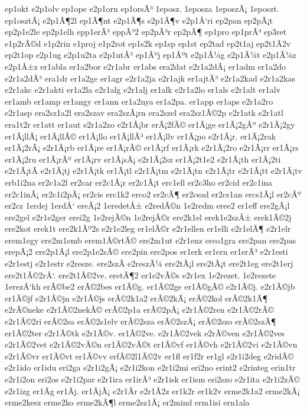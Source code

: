 {ep1okt
e2p1olv
ep1ope
e2p1orn
ep1orsÃ³
1eposz.
1eposza
1eposzÃ¡
1eposzt.
ep1osztÃ¡
e2p1Ã¶2l
ep1Ã¶nt
e2p1Ã¶s
e2p1Ã¶v
e2p1Å‘ri
ep2pan
ep2pÃ¡t
ep2p1e2le
ep2p1elh
epp1erÃ³
eppÃ³2
ep2pÃ³r
ep2pÃ¶
ep1pro
ep1prÃ³
ep3ret
e1p2rÃ©d
e1p2rin
e1proj
e1p2rot
ep1s2k
ep1sp
ep1st
ep2tad
ep2t1aj
ep2t1Ã­2v
ep2t1op
e2p1ug
e2p1u2ta
e2p1utÃ³
ep1Ãºj
ep1Ãºt
e2p1Ã¼g
e2p1Ã¼t
e2p1Ã¼z
e2p1Å±z
er1abla
er1a2bor
e2r1abr
er1abs
era2dat
e2r1a2dÃ¡
er1adm
er1a2do
e2r1a2dÃ³
era1dr
er1a2ge
er1agr
e2r1a2ja
e2r1ajk
er1ajtÃ³
e2r1a2kad
e2r1a2kas
e2r1akc
e2r1akti
er1a2la
e2r1alg
e2r1alj
er1alk
e2r1a2lo
er1als
e2r1alt
er1alv
er1amb
er1amp
er1angy
er1ann
er1a2nya
er1a2pa.
er1app
er1aps
e2r1a2ro
e2r1asp
era2sz1a2l
era2szav
era2szÃ¡rn
era2szel
era2sz1Ã©2p
e2r1atk
e2r1atl
era1t2r
er1att
er1aut
e2r1a2zo
e2r1Ã¡br
erÃ¡2fÃ©
er1Ã¡ge
er1Ã¡2gÃº
e2r1Ã¡2gy
er1Ã¡llÃ¡
er1Ã¡llÃ©
er1Ã¡llo
er1Ã¡llÃ³
er1Ã¡llv
er1Ã¡po
e2r1Ã¡r.
er1Ã¡2rak
er1Ã¡2rÃ¡
e2r1Ã¡rb
er1Ã¡re
er1Ã¡rÃ©
er1Ã¡rf
er1Ã¡rk
e2r1Ã¡2ro
e2r1Ã¡rr
er1Ã¡rs
er1Ã¡2ru
er1Ã¡rÃº
er1Ã¡rv
er1Ã¡sÃ¡
e2r1Ã¡2sz
er1Ã¡2t1e2
e2r1Ã¡th
er1Ã¡2ti
e2r1Ã¡tÃ­
e2r1Ã¡tj
e2r1Ã¡tk
er1Ã¡tl
e2r1Ã¡tm
e2r1Ã¡tn
e2r1Ã¡tr
e2r1Ã¡tt
e2r1Ã¡tv
erb1i2na
er2c1a2l
er2car
er2c1Ã¡r
er2c1Ã¡t
erc1ell
er2c3ho
er2cid
er2c1ina
er2c1inÃ¡
er2c1i2pÃ¡
er2cis
erc1k2
erco2
er2cÃ¶
er2csad
er2cs1an
ercs1Ã¡l
er2cÃº
er2cz
1erdej
1erdÅ‘
ereÃ¡2
1eredetÅ±
e2redÃ©n
1e2redm
eree2
er1eff
ere2gÃ¡l
ere2gel
e2r1e2ger
erei2g
1e2rejÃ©n
1e2rejÃ©r
ere2k1el
erek1e2szÅ±
erek1Ã©2j
ere2kot
erek1t
ere2k1Ãº2s
e2r1e2leg
er1elÃ©r
e2r1ellen
er1elli
e2r1elÃ¶
e2r1elr
erem1egy
ere2m1emb
erem1Ã©rtÃ©
ere2m1ut
e2r1enz
ereo1gra
ere2pan
ere2pas
erepÃ¡2
ere2p1Ã¡l
ere2p1e2sÃ©
ere2pin
ere2pos
er1erk
er1ern
er1erÃ³
e2r1esti
e2r1estj
e2r1estr
e2resze.
ere2szÃ­
e2reszÃ¼
ere2tÃ¡l
ere2tÃ¡t
ere2t1eg
ere2t1erj
ere2t1Ã©2rÅ‘.
ere2t1Ã©2ve.
eretÃ¶2
er1e2vÃ©s
e2r1ex
1e2rezet.
1e2rezete
1erezÅ‘kh
erÃ©be2
erÃ©2bes
er1Ã©g.
er1Ã©2ge
er1Ã©gÃ©
e2r1Ã©j.
e2r1Ã©jb
er1Ã©jf
e2r1Ã©jn
e2r1Ã©js
erÃ©2k1a2
erÃ©2kÃ¡
erÃ©2kol
erÃ©2k1Ã¶
e2rÃ©neke
e2r1Ã©2nekÃ©
erÃ©2p1a
erÃ©2pÃ¡
e2r1Ã©2ren
e2r1Ã©2rÃ©
e2r1Ã©2ri
erÃ©2sa
erÃ©2s1elv
erÃ©2sza
erÃ©2szÃ¡
erÃ©2szo
erÃ©2szÃ¶
er1Ã©2ter
e2r1Ã©tk
e2r1Ã©v.
er1Ã©2ve.
e2r1Ã©2vek
e2rÃ©ven
e2r1Ã©2ves
e2r1Ã©2vet
e2r1Ã©2vÃ©n
er1Ã©2vÃ©t
er1Ã©vf
er1Ã©vh
e2r1Ã©2vi
e2r1Ã©vn
e2r1Ã©vr
er1Ã©vt
er1Ã©vv
erfÃ©2l1Ã©2v
er1fl
er1f2r
er1gl
e2r1i2deg
e2ridÃ©
e2r1ido
er1idu
eri2ga
e2r1i2gÃ¡
e2r1i2kon
e2r1i2mi
eri2no
erint2
e2rinteg
erin1tr
e2r1i2on
eri2os
e2r1i2par
e2r1ira
er1irÃ³
e2r1isk
er1ism
eri2szo
e2r1ita
e2r1i2zÃ©
e2r1izg
er1Ã­g
er1Ã­j.
er1Ã­jÃ¡
e2r1Ã­r
e2r1Ã­2z
er1k2r
er1k2v
erme2k1a2
erme2kÃ¡
erme2kesz
erme2ko
erme2kÃ¶l
erme2sz1Ã¡
er2mind
erm1isi
ern1ala
}
